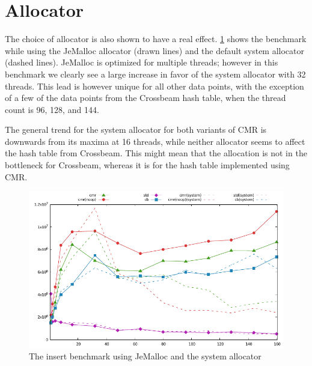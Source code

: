 \clearpage
\section{Allocator}

The choice of allocator is also shown to have a real effect. \cref{fig:jemalloc-diff} shows the
 benchmark while using the JeMalloc allocator (drawn lines) and the default
system allocator (dashed lines).
JeMalloc is optimized for multiple threads; however in this benchmark we clearly see a large
increase in favor of the system allocator with 32 threads. This lead is however unique for all
other data points, with the exception of a few of the data points from the Crossbeam hash table,
when the thread count is 96, 128, and 144.

The general trend for the system allocator for both variants of CMR is downwards from its maxima at
16 threads, while neither allocator seems to affect the hash table from Crossbeam.
This might mean that the allocation is not in the bottleneck for Crossbeam, whereas it is for the
hash table implemented using CMR\@.

\begin{figure}[ht]
  \centering
  \includegraphics{graphs/jemalloc-difference}
  \caption{The  insert benchmark using JeMalloc and the system allocator\label{fig:jemalloc-diff}}
\end{figure}

